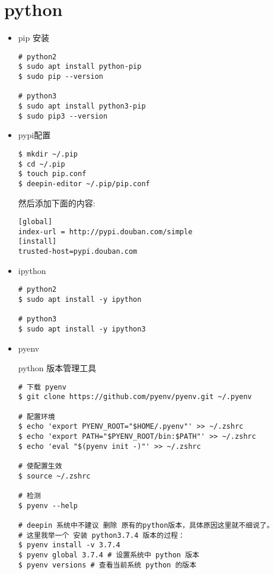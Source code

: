 \section{python}
\begin{itemize}
\item pip 安装
\begin{lstlisting}
# python2
$ sudo apt install python-pip
$ sudo pip --version

# python3
$ sudo apt install python3-pip
$ sudo pip3 --version
\end{lstlisting}

\item pypi配置
\begin{lstlisting}
$ mkdir ~/.pip
$ cd ~/.pip
$ touch pip.conf
$ deepin-editor ~/.pip/pip.conf 
\end{lstlisting}

然后添加下面的内容:
\begin{lstlisting}
[global]
index-url = http://pypi.douban.com/simple
[install]
trusted-host=pypi.douban.com
\end{lstlisting}

\item ipython
\begin{lstlisting}
# python2
$ sudo apt install -y ipython

# python3
$ sudo apt install -y ipython3 
\end{lstlisting}

\item pyenv   

python 版本管理工具    
\begin{lstlisting}
# 下载 pyenv
$ git clone https://github.com/pyenv/pyenv.git ~/.pyenv

# 配置环境
$ echo 'export PYENV_ROOT="$HOME/.pyenv"' >> ~/.zshrc
$ echo 'export PATH="$PYENV_ROOT/bin:$PATH"' >> ~/.zshrc
$ echo 'eval "$(pyenv init -)"' >> ~/.zshrc

# 使配置生效
$ source ~/.zshrc

# 检测
$ pyenv --help

# deepin 系统中不建议 删除 原有的python版本，具体原因这里就不细说了。
# 这里我举一个 安装 python3.7.4 版本的过程：
$ pyenv install -v 3.7.4
$ pyenv global 3.7.4 # 设置系统中 python 版本
$ pyenv versions # 查看当前系统 python 的版本

\end{lstlisting}
\end{itemize}
\newpage


